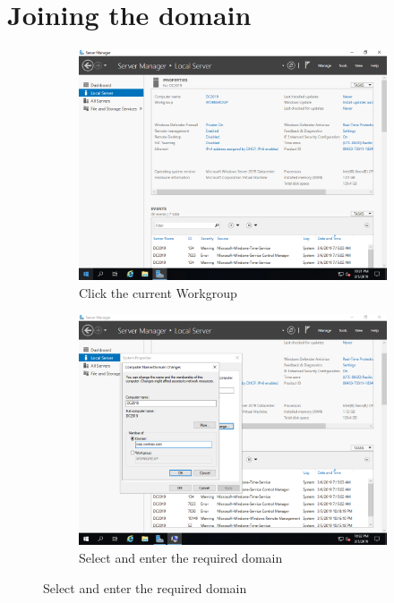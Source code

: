 \section{Joining the domain}
\begin{figure}[!htb]
	\begin{subfigure}{0.5\textwidth}
		\captionsetup{width=0.8\linewidth}
		\includegraphics[width=0.9\linewidth]{img/Methodologie/Migration10.png}
		\centering
		\caption{Click the current Workgroup}
	\end{subfigure}
	\begin{subfigure}{0.5\textwidth}
		\captionsetup{width=0.8\linewidth}
		\includegraphics[width=0.9\linewidth]{img/Methodologie/Migration11.png} 
		\centering
		\caption{Select and enter the required domain}
	\end{subfigure}
\end{figure}
